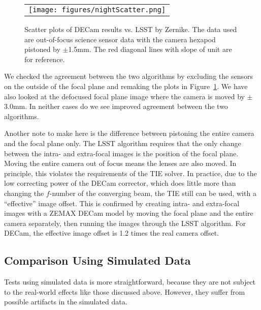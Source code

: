 \documentclass[]{spie}  %
\begin{document}
   \begin{figure} [tbph]
   \begin{center}
   \begin{tabular}{c} %
   \texttt{[image: figures/nightScatter.png]}
   \end{tabular}
   \end{center}
   \caption[example] 
   { \label{fig:nightScatter} 
Scatter plots of DECam results vs. LSST by Zernike. The data used are out-of-focus science sensor data with the camera hexapod pistoned by $\pm$1.5mm. The red diagonal lines with slope of unit are for reference.
}
   \end{figure} 

We checked the agreement between the two algorithms by excluding the sensors on the outside of the focal plane and remaking the plots in Figure~\ref{fig:nightScatter}. 
We have also looked at the defocused focal plane image where the camera is moved by $\pm$3.0mm.
In neither cases do we see improved agreement between the two algorithms.

Another note to make here is the difference between pistoning the entire camera and the focal plane only.
The LSST algorithm requires that the only change between the intra- and extra-focal images is the position of the focal plane. Moving the entire camera out of focus means the lenses are also moved. In principle, this violates the requirements of the TIE solver.
In practice, due to the low correcting power of the DECam corrector, which does little more than changing the $f$-number of the converging beam, the TIE still can be used, with a ``effective'' image offset.
This is confirmed by creating intra- and extra-focal images with a ZEMAX DECam model by moving the focal plane and the entire camera separately, then running the images through the LSST algorithm.
For DECam, the effective image offset is 1.2 times the real camera offset.

\subsection{Comparison Using Simulated Data}

Tests using simulated data is more straightforward, because they are not subject to the real-world effects like those discussed above. However, they suffer from possible artifacts in the simulated data.
		  
\end{document}
